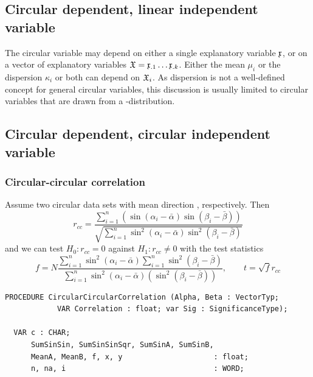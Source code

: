 \begin{refsection}
\subsection{Circular dependent, linear independent variable}

The circular variable \skalar{\theta} may depend on either a single explanatory variable \( \mathfrak{x} \), or on a vector of  explanatory variables \( \mathfrak{X} = \mathfrak{x}_{.1}\ldots \mathfrak{x}_{.k} \). Either the mean \( \mu_i \) or the dispersion \( \kappa_i \) or both can depend on \( \mathfrak{X}_i \). As dispersion is not a well-defined concept for general circular variables, this discussion is usually limited to circular variables that are drawn from a -distribution.

\subsection{Circular dependent, circular independent variable}

\subsubsection{Circular-circular correlation }

Assume two circular data sets \skalar{\alpha, \beta} with mean direction \skalar{\bar{\alpha}, \bar{\beta}}, respectively. Then
\begin{equation}
  r_{cc} = \frac{\sum_{i=1}^n\left(\sin(\alpha_i - \bar{\alpha}) \sin(\beta_i - \bar{\beta})\right)}{\sqrt{\sum_{i=1}^n{\sin^2(\alpha_i - \bar{\alpha}) \sin^2(\beta_i - \bar{\beta})}}}
\end{equation}
and we can test \textbf{\( H_0: r_{cc} = 0 \)} against \textbf{\( H_1: r_{cc} \neq 0 \)} with the test statistics
\begin{equation}
   f = N \frac{\sum_{i=1}^n{\sin^2(\alpha_i - \bar{\alpha}) \sum_{i=1}^n{\sin^2(\beta_i - \bar{\beta})}}}{\sum_{i=1}^n{\sin^2(\alpha_i - \bar{\alpha}) (\sin^2(\beta_i - \bar{\beta}))}},\qquad t = \sqrt{f} r_{cc}
\end{equation}

\begin{lstlisting}[caption=Correlation between linear and circular data]
  PROCEDURE CircularCircularCorrelation (Alpha, Beta : VectorTyp;
            VAR Correlation : float; var Sig : SignificanceType);

  VAR c : CHAR;
      SumSinSin, SumSinSinSqr, SumSinA, SumSinB,
      MeanA, MeanB, f, x, y                     : float;
      n, na, i                                  : WORD;


\end{lstlisting}
\end{refsection}
